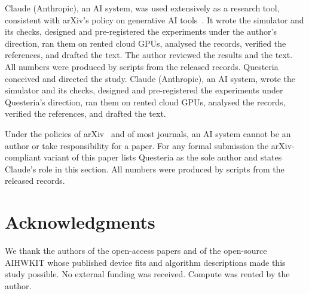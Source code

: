 Claude (Anthropic), an AI system, was used extensively as a research tool, consistent with arXiv's policy on generative AI
tools~\cite{arxiv_policy}. It wrote the simulator and its checks, designed and pre-registered the experiments under the
author's direction, ran them on rented cloud GPUs, analysed the records, verified the references, and drafted the text. The
author reviewed the results and the text. All numbers were produced by scripts from the released records.
\else
Questeria conceived and directed the study. Claude (Anthropic), an AI system, wrote the simulator and its checks, designed and
pre-registered the experiments under Questeria's direction, ran them on rented cloud GPUs, analysed the records, verified the
references, and drafted the text.

Under the policies of arXiv~\cite{arxiv_policy} and of most journals, an AI system cannot be an author or take responsibility
for a paper. For any formal submission the arXiv-compliant variant of this paper lists Questeria as the sole author and states
Claude's role in this section. All numbers were produced by scripts from the released records.
\fi

\section*{Acknowledgments}
We thank the authors of the open-access papers and of the open-source AIHWKIT whose published device fits and algorithm
descriptions made this study possible. No external funding was received. Compute was rented by the author.




\appendix






